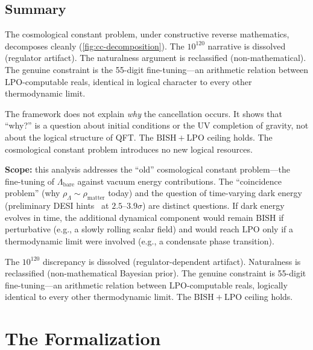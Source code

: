 \documentclass[11pt,a4paper]{report}
\theoremstyle{plain}
\theoremstyle{definition}
\theoremstyle{remark}
\newcommand{\BISH}{\mathrm{BISH}}
\newcommand{\LPO}{\mathrm{LPO}}
\begin{document}
\section{Summary}

The cosmological constant problem, under constructive reverse mathematics, decomposes cleanly (\cref{fig:cc-decomposition}). The $10^{120}$ narrative is dissolved (regulator artifact). The naturalness argument is reclassified (non-mathematical). The genuine constraint is the 55-digit fine-tuning---an arithmetic relation between $\LPO$-computable reals, identical in logical character to every other thermodynamic limit.

The framework does not explain \emph{why} the cancellation occurs. It shows that ``why?'' is a question about initial conditions or the UV completion of gravity, not about the logical structure of QFT. The $\BISH+\LPO$ ceiling holds. The cosmological constant problem introduces no new logical resources.

\textbf{Scope:} this analysis addresses the ``old'' cosmological constant problem---the fine-tuning of $\Lambda_{\mathrm{bare}}$ against vacuum energy contributions. The ``coincidence problem'' (why $\rho_\Lambda \sim \rho_{\mathrm{matter}}$ today) and the question of time-varying dark energy (preliminary DESI hints~\cite{DESI2024} at $2.5$--$3.9\sigma$) are distinct questions. If dark energy evolves in time, the additional dynamical component would remain $\BISH$ if perturbative (e.g., a slowly rolling scalar field) and would reach $\LPO$ only if a thermodynamic limit were involved (e.g., a condensate phase transition).

\begin{chapterbox}
The $10^{120}$ discrepancy is dissolved (regulator-dependent artifact). Naturalness is reclassified (non-mathematical Bayesian prior). The genuine constraint is 55-digit fine-tuning---an arithmetic relation between $\LPO$-computable reals, logically identical to every other thermodynamic limit. The $\BISH+\LPO$ ceiling holds.
\end{chapterbox}

\chapter{The Formalization}
\end{document}
